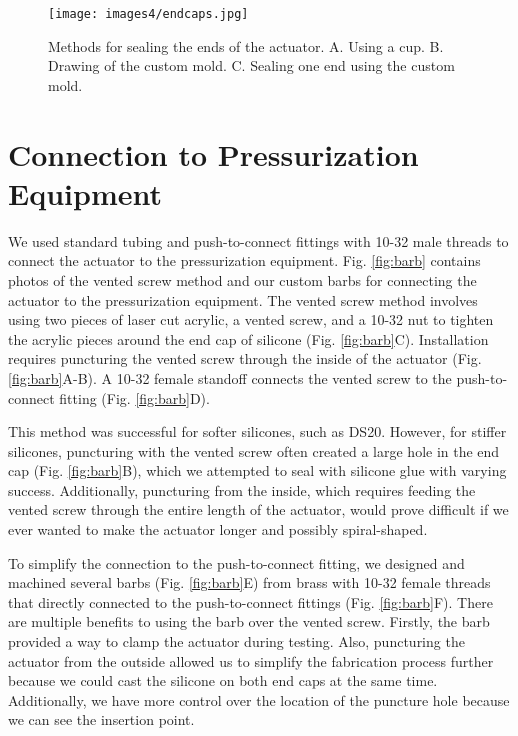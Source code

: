 \begin{figure}[ht!]
    \centering
    \texttt{[image: images4/endcaps.jpg]}
    \caption{Methods for sealing the ends of the actuator. A. Using a cup. B. Drawing of the custom mold. C. Sealing one end using the custom mold.}
    \label{fig:endcaps}
\end{figure}

\clearpage
\section{Connection to Pressurization Equipment}

We used standard tubing and push-to-connect fittings with 10-32 male threads to connect the actuator to the pressurization equipment. Fig. \ref{fig:barb} contains photos of the vented screw method and our custom barbs for connecting the actuator to the pressurization equipment. The vented screw method \cite{polygerinos_modeling_2015} involves using two pieces of laser cut acrylic, a vented screw, and a 10-32 nut to tighten the acrylic pieces around the end cap of silicone (Fig. \ref{fig:barb}C). Installation requires puncturing the vented screw through the inside of the actuator (Fig. \ref{fig:barb}A-B). A 10-32 female standoff connects the vented screw to the push-to-connect fitting (Fig. \ref{fig:barb}D). 

This method was successful for softer silicones, such as DS20. However, for stiffer silicones, puncturing with the vented screw often created a large hole in the end cap (Fig. \ref{fig:barb}B), which we attempted to seal with silicone glue with varying success. Additionally, puncturing from the inside, which requires feeding the vented screw through the entire length of the actuator, would prove difficult if we ever wanted to make the actuator longer and possibly spiral-shaped. 

To simplify the connection to the push-to-connect fitting, we designed and machined several barbs (Fig. \ref{fig:barb}E) from brass with 10-32 female threads that directly connected to the push-to-connect fittings (Fig. \ref{fig:barb}F). There are multiple benefits to using the barb over the vented screw. Firstly, the barb provided a way to clamp the actuator during testing. Also, puncturing the actuator from the outside allowed us to simplify the fabrication process further because we could cast the silicone on both end caps at the same time. Additionally, we have more control over the location of the puncture hole because we can see the insertion point. 

